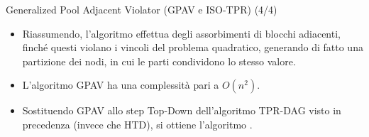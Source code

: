 \documentclass[9pt]{beamer}
\begin{document}
\begin{tframe}{Generalized Pool Adjacent Violator (GPAV e ISO-TPR) (4/4)}
\begin{center}
\end{center}
\begin{itemize}
\item Riassumendo, l’algoritmo effettua degli assorbimenti di blocchi adiacenti, finché questi violano i vincoli del problema quadratico, generando di fatto una partizione dei nodi, in cui le parti condividono lo stesso valore.
\item L'algoritmo GPAV ha una complessità pari a $O(n^2)$.
\item Sostituendo GPAV allo step Top-Down dell'algoritmo TPR-DAG visto in precedenza (invece che HTD), si ottiene l'algoritmo .
\end{itemize}
\end{tframe}

\end{document}
